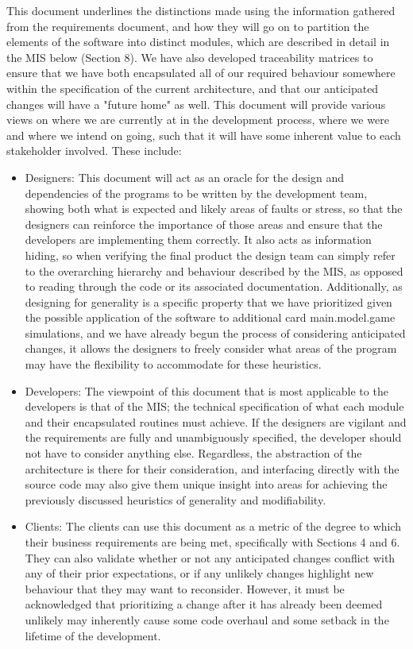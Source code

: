 \documentclass[12pt, titlepage]{article}
\begin{document}
This document underlines the distinctions made using the information gathered from the requirements document, and how they will go on to partition the elements of the software into distinct modules, which are described in detail in the MIS below (Section 8). We have also developed traceability matrices to ensure that we have both encapsulated all of our required behaviour somewhere within the specification of the current architecture, and that our anticipated changes will have a "future home" as well. This document will provide various views on where we are currently at in the development process, where we were and where we intend on going, such that it will have some inherent value to each stakeholder involved. These include:

\begin{itemize}
    \item Designers: This document will act as an oracle for the design and dependencies of the programs to be written by the development team, showing both what is expected and likely areas of faults or stress, so that the designers can reinforce the importance of those areas and ensure that the developers are implementing them correctly. It also acts as information hiding, so when verifying the final product the design team can simply refer to the overarching hierarchy and behaviour described by the MIS, as opposed to reading through the code or its associated documentation. Additionally, as designing for generality is a specific property that we have prioritized given the possible application of the software to additional card main.model.game simulations, and we have already begun the process of considering anticipated changes, it allows the designers to freely consider what areas of the program may have the flexibility to accommodate for these heuristics.
    \item Developers: The viewpoint of this document that is most applicable to the developers is that of the MIS; the technical specification of what each module and their encapsulated routines must achieve. If the designers are vigilant and the requirements are fully and unambiguously specified, the developer should not have to consider anything else. Regardless, the abstraction of the architecture is there for their consideration, and interfacing directly with the source code may also give them unique insight into areas for achieving the previously discussed heuristics of generality and modifiability.
    \item Clients: The clients can use this document as a metric of the degree to which their business requirements are being met, specifically with Sections 4 and 6. They can also validate whether or not any anticipated changes conflict with any of their prior expectations, or if any unlikely changes highlight new behaviour that they may want to reconsider. However, it must be acknowledged that prioritizing a change after it has already been deemed unlikely may inherently cause some code overhaul and some setback in the lifetime of the development.  
\end{itemize}
\end{document}
